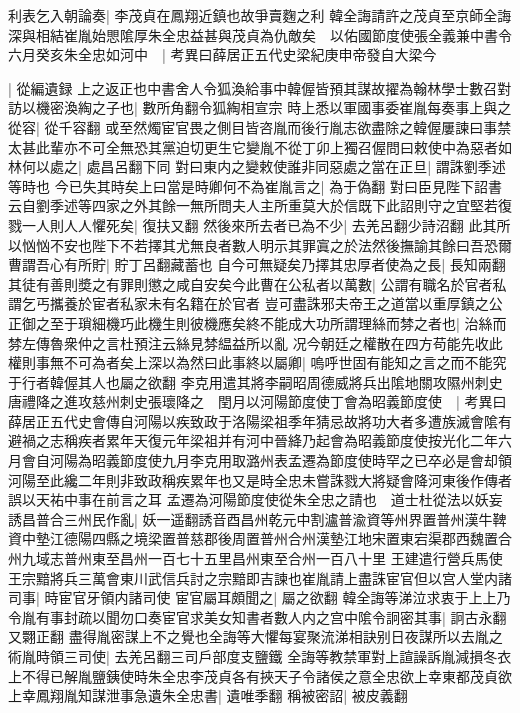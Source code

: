 利表乞入朝論奏|{
	李茂貞在鳳翔近鎮也故爭賣麴之利}
韓全誨請許之茂貞至京師全誨深與相結崔胤始愳隂厚朱全忠益甚與茂貞為仇敵矣　以佑國節度使張全義兼中書令六月癸亥朱全忠如河中　|{
	考異曰薛居正五代史梁紀庚申帝發自大梁今}


|{
	從編遺録}
上之返正也中書舍人令狐渙給事中韓偓皆預其謀故擢為翰林學士數召對訪以機密渙綯之子也|{
	數所角翻令狐綯相宣宗}
時上悉以軍國事委崔胤每奏事上與之從容|{
	從千容翻}
或至然燭宦官畏之側目皆咨胤而後行胤志欲盡除之韓偓屢諫曰事禁太甚此輩亦不可全無恐其黨迫切更生它變胤不從丁卯上獨召偓問曰敕使中為惡者如林何以處之|{
	處昌呂翻下同}
對曰東内之變敕使誰非同惡處之當在正旦|{
	謂誅劉季述等時也}
今已失其時矣上曰當是時卿何不為崔胤言之|{
	為于偽翻}
對曰臣見陛下詔書云自劉季述等四家之外其餘一無所問夫人主所重莫大於信既下此詔則守之宜堅若復戮一人則人人懼死矣|{
	復扶又翻}
然後來所去者已為不少|{
	去羌呂翻少詩沼翻}
此其所以忷忷不安也陛下不若擇其尤無良者數人明示其罪寘之於法然後撫諭其餘曰吾恐爾曹謂吾心有所貯|{
	貯丁呂翻藏蓄也}
自今可無疑矣乃擇其忠厚者使為之長|{
	長知兩翻}
其徒有善則奬之有罪則懲之咸自安矣今此曹在公私者以萬數|{
	公謂有職名於官者私謂乞丐攜養於宦者私家未有名籍在於官者}
豈可盡誅邪夫帝王之道當以重厚鎮之公正御之至于瑣細機巧此機生則彼機應矣終不能成大功所謂理絲而棼之者也|{
	治絲而棼左傳魯衆仲之言杜預注云絲見棼緼益所以亂}
况今朝廷之權散在四方苟能先收此權則事無不可為者矣上深以為然曰此事終以屬卿|{
	嗚呼世固有能知之言之而不能究于行者韓偓其人也屬之欲翻}
李克用遣其將李嗣昭周德威將兵出隂地關攻隰州刺史唐禮降之進攻慈州刺史張瓌降之　閏月以河陽節度使丁會為昭義節度使　|{
	考異曰薛居正五代史會傳自河陽以疾致政于洛陽梁祖季年猜忌故將功大者多遭族滅會隂有避禍之志稱疾者累年天復元年梁祖并有河中晉絳乃起會為昭義節度使按光化二年六月會自河陽為昭義節度使九月李克用取潞州表孟遷為節度使時罕之已卒必是會却領河陽至此纔二年則非致政稱疾累年也又是時全忠未嘗誅戮大將疑會降河東後作傳者誤以天祐中事在前言之耳}
孟遷為河陽節度使從朱全忠之請也　道士杜從法以妖妄誘昌普合三州民作亂|{
	妖一遥翻誘音酉昌州乾元中割瀘普渝資等州界置普州漢牛鞞資中墊江德陽四縣之境梁置普慈郡後周置普州合州漢墊江地宋置東宕渠郡西魏置合州九域志普州東至昌州一百七十五里昌州東至合州一百八十里}
王建遣行營兵馬使王宗黯將兵三萬會東川武信兵討之宗黯即吉諫也崔胤請上盡誅宦官但以宫人堂内諸司事|{
	時宦官牙領内諸司使}
宦官屬耳頗聞之|{
	屬之欲翻}
韓全誨等涕泣求衷于上上乃令胤有事封疏以聞勿口奏宦官求美女知書者數人内之宫中隂令詗密其事|{
	詗古永翻又翾正翻}
盡得胤密謀上不之覺也全誨等大懼每宴聚流涕相訣别日夜謀所以去胤之術胤時領三司使|{
	去羌呂翻三司戶部度支鹽鐵}
全誨等教禁軍對上諠譟訴胤減損冬衣上不得已解胤鹽銕使時朱全忠李茂貞各有挾天子令諸侯之意全忠欲上幸東都茂貞欲上幸鳳翔胤知謀泄事急遺朱全忠書|{
	遺唯季翻}
稱被密詔|{
	被皮義翻}
